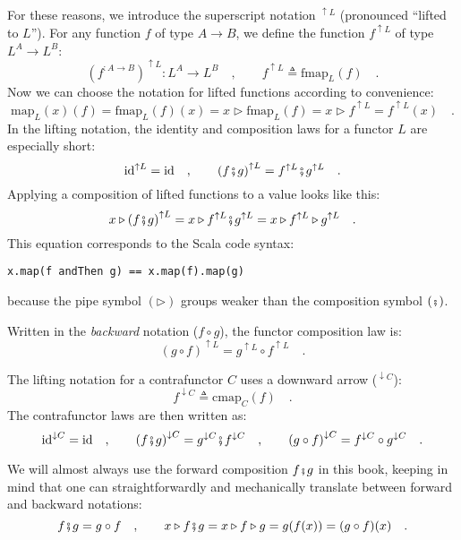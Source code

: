 For these reasons, we introduce the superscript notation $^{\uparrow L}$
(pronounced \textsf{``}lifted to $L$\textsf{''}). For any function $f$ of type $A\rightarrow B$,
we define the function $f^{\uparrow L}$ of type $L^{A}\rightarrow L^{B}$:
\[
(f^{:A\rightarrow B})^{\uparrow L}:L^{A}\rightarrow L^{B}\quad,\quad\quad f^{\uparrow L}\triangleq\text{fmap}_{L}(f)\quad.
\]
Now we can choose the notation for lifted functions according to convenience:
\[
\text{map}_{L}(x)(f)=\text{fmap}_{L}(f)(x)=x\triangleright\text{fmap}_{L}(f)=x\triangleright f^{\uparrow L}=f^{\uparrow L}(x)\quad.
\]
In the lifting notation,
the identity and composition laws for a functor $L$ are especially
short:
\begin{equation}
\text{id}^{\uparrow L}=\text{id}\quad,\quad\quad\left(f\bef g\right)^{\uparrow L}=f^{\uparrow L}\bef g^{\uparrow L}\quad.\label{eq:functor-laws-in-short-notation}
\end{equation}
Applying a composition of lifted functions to a value looks like this:
\[
x\triangleright\left(f\bef g\right)^{\uparrow L}=x\triangleright f^{\uparrow L}\bef g^{\uparrow L}=x\triangleright f^{\uparrow L}\triangleright g^{\uparrow L}\quad.
\]
This equation corresponds to the Scala code syntax:
\begin{lstlisting}
x.map(f andThen g) == x.map(f).map(g)
\end{lstlisting}
because the pipe symbol $\left(\triangleright\right)$ groups weaker
than the composition symbol $\left(\bef\right)$.

Written in the \emph{backward} notation ($f\circ g$), the functor
composition law is:
\[
\left(g\circ f\right)^{\uparrow L}=g^{\uparrow L}\circ f^{\uparrow L}\quad.
\]

The lifting notation for a contrafunctor $C$ uses a downward arrow
($^{\downarrow C}$):
\[
f^{\downarrow C}\triangleq\text{cmap}_{C}(f)\quad.
\]
The contrafunctor laws are then written as:
\[
\text{id}^{\downarrow C}=\text{id}\quad,\quad\quad\left(f\bef g\right)^{\downarrow C}=g^{\downarrow C}\bef f^{\downarrow C}\quad,\quad\quad\left(g\circ f\right)^{\downarrow C}=f^{\downarrow C}\circ g^{\downarrow C}\quad.
\]

We will almost always use the forward composition $f\bef g$ in this
book, keeping in mind that one can straightforwardly and mechanically
translate between forward and backward notations:
\[
f\bef g=g\circ f\quad,\quad\quad x\triangleright f\bef g=x\triangleright f\triangleright g=g(f(x))=(g\circ f)(x)\quad.
\]


